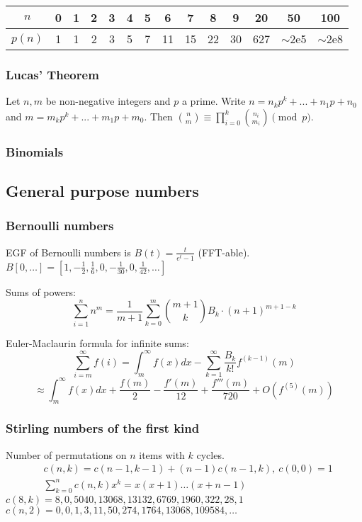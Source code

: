     \begin{center}
    \begin{tabular}{c|c@{\ }c@{\ }c@{\ }c@{\ }c@{\ }c@{\ }c@{\ }c@{\ }c@{\ }c@{\ }c@{\ }c@{\ }c}
      $n$    & 0 & 1 & 2 & 3 & 4 & 5 & 6  & 7  & 8  & 9  & 20  & 50  & 100 \\ \hline
      $p(n)$ & 1 & 1 & 2 & 3 & 5 & 7 & 11 & 15 & 22 & 30 & 627 & $\mathtt{\sim}$2e5 & $\mathtt{\sim}$2e8 \\
    \end{tabular}
    \end{center}

  \subsubsection{Lucas' Theorem}
    Let $n,m$ be non-negative integers and $p$ a prime. Write $n=n_kp^k+...+n_1p+n_0$ and $m=m_kp^k+...+m_1p+m_0$. Then $\binom{n}{m} \equiv \prod_{i=0}^k\binom{n_i}{m_i} \pmod{p}$.

  \subsubsection{Binomials}

\subsection{General purpose numbers}
  \subsubsection{Bernoulli numbers}
    EGF of Bernoulli numbers is $B(t)=\frac{t}{e^t-1}$ (FFT-able).
    $B[0,\ldots] = [1, -\frac{1}{2}, \frac{1}{6}, 0, -\frac{1}{30}, 0, \frac{1}{42}, \ldots]$

    Sums of powers:
    \small
    \[ \sum_{i=1}^n n^m = \frac{1}{m+1} \sum_{k=0}^m \binom{m+1}{k} B_k \cdot (n+1)^{m+1-k} \]
    \normalsize

    Euler-Maclaurin formula for infinite sums:
    \small
    \[ \sum_{i=m}^{\infty} f(i) = \int_m^\infty f(x) dx - \sum_{k=1}^\infty \frac{B_k}{k!}f^{(k-1)}(m) \]
    \[ \approx \int_{m}^\infty f(x)dx + \frac{f(m)}{2} - \frac{f'(m)}{12} + \frac{f'''(m)}{720} + O(f^{(5)}(m)) \]
    \normalsize

  \subsubsection{Stirling numbers of the first kind}
    Number of permutations on $n$ items with $k$ cycles.
    \begin{align*}
      &c(n,k) = c(n-1,k-1) + (n-1) c(n-1,k),\ c(0,0) = 1 \\
      &\textstyle \sum_{k=0}^n c(n,k)x^k = x(x+1) \dots (x+n-1)
    \end{align*}
    $c(8,k) = 8, 0, 5040, 13068, 13132, 6769, 1960, 322, 28, 1$ \\
    $c(n,2) = 0, 0, 1, 3, 11, 50, 274, 1764, 13068, 109584, \dots$

